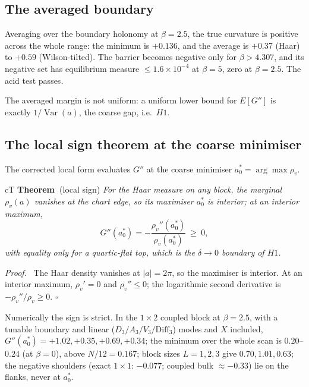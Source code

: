 \documentclass[11pt,a4paper]{article}
\newcounter{claim}
\newcommand{\claimhead}[2]{%
  \refstepcounter{claim}%
  \textbf{#1~\theclaim}#2\hspace{0.35em}\ignorespaces}
\newenvironment{proofx}{\par\noindent\emph{Proof.}\ }{\hfill$\square$\par\medskip}
\begin{document}
\subsection{The averaged boundary}
\label{sec:avg}

Averaging over the boundary holonomy at $\beta=2.5$, the true curvature is positive across the whole
range: the minimum is $+0.136$, and the average is $+0.37$ (Haar) to $+0.59$ (Wilson-tilted). The
barrier becomes negative only for $\beta>4.307$, and its negative set has equilibrium measure
$\le1.6\times10^{-4}$ at $\beta=5$, zero at $\beta=2.5$. The acid test passes.

The averaged margin is not uniform: a uniform lower bound for $E[G'']$ is exactly
$1/\operatorname{Var}(a)$, the coarse gap, i.e.\ $H1$.

\subsection{The local sign theorem at the coarse minimiser}
\label{sec:local}

The corrected local form evaluates $G''$ at the coarse minimiser $a_0^*=\arg\max\rho_v$.

\begin{claimbox}{cT}
\claimhead{Theorem}{(local sign)} \emph{For the Haar measure on any block, the marginal
$\rho_v(a)$ vanishes at the chart edge, so its maximiser $a_0^*$ is interior; at an interior
maximum,}
\begin{equation}
G''(a_0^*)=-\frac{\rho_v''(a_0^*)}{\rho_v(a_0^*)}\ \ge\ 0 ,
\label{eq:localsign}
\end{equation}
\emph{with equality only for a quartic-flat top, which is the $\delta\to0$ boundary of $H1$.}
\end{claimbox}

\begin{proofx}
The Haar density vanishes at $|a|=2\pi$, so the maximiser is interior. At an interior maximum,
$\rho_v'=0$ and $\rho_v''\le0$; the logarithmic second derivative is $-\rho_v''/\rho_v\ge0$.
\end{proofx}

Numerically the sign is strict. In the $1\times2$ coupled block at $\beta=2.5$, with a tunable
boundary and linear ($D_3/A_3/V_3/\mathrm{Diff}_3$) modes and $X$ included,
$G''(a_0^*)=+1.02,+0.35,+0.69,+0.34$; the minimum over the whole scan is $0.20$--$0.24$ (at
$\beta=0$), above $N/12=0.167$; block sizes $L=1,2,3$ give $0.70,1.01,0.63$; the negative shoulders
(exact $1\times1$: $-0.077$; coupled bulk $\approx-0.33$) lie on the flanks, never at $a_0^*$.
\end{document}
